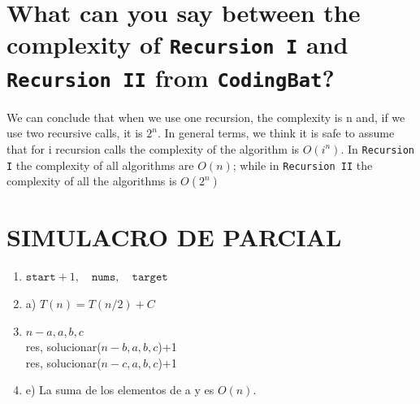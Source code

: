 \documentclass[a4paper,12pt]{article}
\begin{document}
    \section{What can you say between the complexity of \texttt{Recursion I} and \texttt{Recursion II} from \texttt{CodingBat}?}
    We can conclude that when we use one recursion, the complexity is n and, if we use two
    recursive calls, it is $2^n$. In general terms, we think it is safe to assume that
    for i recursion calls the complexity of the algorithm is $O(i^n)$.
    In \texttt{Recursion I} the complexity of all algorithms are $O(n)$; while in \texttt{Recursion II}
    the complexity of all the algorithms is $O(2^n)$

    \section{SIMULACRO DE PARCIAL}
    \begin{enumerate}
      \item $\texttt{start}+1,\quad \texttt{nums},\quad \texttt{target}$
      \item a) $T(n) = T(n/2) + C$
      \item $n-a, a, b, c$\\
      res, solucionar($n-b,a,b,c$)+1\\
      res, solucionar($n-c,a,b,c$)+1
      \item e) La suma de los elementos de a y es $O(n)$.
    \end{enumerate}


    \newpage
    
    
\end{document}
